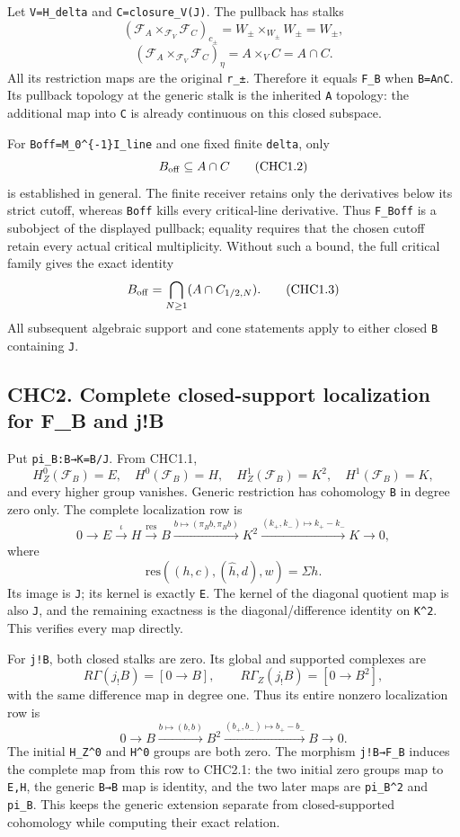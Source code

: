 Let \texttt{V=H\_delta} and \texttt{C=closure\_V(J)}. The pullback has
stalks \[
(\mathcal F_A\times_{\mathcal F_V}\mathcal F_C)_{c_\pm}
=W_\pm\times_{W_\pm}W_\pm=W_\pm,
\] \[
(\mathcal F_A\times_{\mathcal F_V}\mathcal F_C)_\eta
=A\times_V C=A\cap C.
\] All its restriction maps are the original \texttt{r\_±}. Therefore it
equals \texttt{F\_B} when \texttt{B=A∩C}. Its pullback topology at the
generic stalk is the inherited \texttt{A} topology: the additional map
into \texttt{C} is already continuous on this closed subspace.

For \texttt{Boff=M\_0\^{}\{-1\}I\_line} and one fixed finite
\texttt{delta}, only \[
B_{\rm off}\subseteq A\cap C
\tag{CHC1.2}
\] is established in general. The finite receiver retains only the
derivatives below its strict cutoff, whereas \texttt{Boff} kills every
critical-line derivative. Thus \texttt{F\_Boff} is a subobject of the
displayed pullback; equality requires that the chosen cutoff retain
every actual critical multiplicity. Without such a bound, the full
critical family gives the exact identity \[
B_{\rm off}=\bigcap_{N\ge1}(A\cap C_{1/2,N}).
\tag{CHC1.3}
\] All subsequent algebraic support and cone statements apply to either
closed \texttt{B} containing \texttt{J}.

\subsection{CHC2. Complete closed-support localization for F\_B and
j!B}\label{chc2.-complete-closed-support-localization-for-f_b-and-jb}

Put \texttt{pi\_B:B→K=B/J}. From CHC1.1, \[
H_Z^0(\mathcal F_B)=E,\quad
H^0(\mathcal F_B)=H,\quad
H_Z^1(\mathcal F_B)=K^2,\quad
H^1(\mathcal F_B)=K,
\] and every higher group vanishes. Generic restriction has cohomology
\texttt{B} in degree zero only. The complete localization row is \[
0\longrightarrow E\xrightarrow{\iota}H
\xrightarrow{\mathrm{res}}B
\xrightarrow{b\mapsto(\pi_Bb,\pi_Bb)}K^2
\xrightarrow{(k_+,k_-)\mapsto k_+-k_-}K
\longrightarrow0,
\tag{CHC2.1}
\] where \[
\mathrm{res}((h,c),(\widehat h,d),w)=\Sigma h.
\] Its image is \texttt{J}; its kernel is exactly \texttt{E}. The kernel
of the diagonal quotient map is also \texttt{J}, and the remaining
exactness is the diagonal/difference identity on \texttt{K\^{}2}. This
verifies every map directly.

For \texttt{j!B}, both closed stalks are zero. Its global and supported
complexes are \[
R\Gamma(j_!B)=[0\to B],\qquad
R\Gamma_Z(j_!B)=[0\to B^2],
\tag{CHC2.2}
\] with the same difference map in degree one. Thus its entire nonzero
localization row is \[
0\longrightarrow B\xrightarrow{b\mapsto(b,b)}B^2
\xrightarrow{(b_+,b_-)\mapsto b_+-b_-}B
\longrightarrow0.
\tag{CHC2.3}
\] The initial \texttt{H\_Z\^{}0} and \texttt{H\^{}0} groups are both
zero. The morphism \texttt{j!B→F\_B} induces the complete map from this
row to CHC2.1: the two initial zero groups map to \texttt{E,H}, the
generic \texttt{B→B} map is identity, and the two later maps are
\texttt{pi\_B\^{}2} and \texttt{pi\_B}. This keeps the generic extension
separate from closed-supported cohomology while computing their exact
relation.

